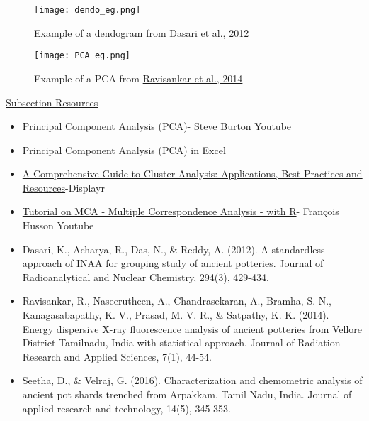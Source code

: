 \documentclass{article}
\begin{document}
\begin{figure}[hbt!]
    \centering
    \texttt{[image: dendo\_eg.png]}
    \caption{Example of a dendogram from \protect\hyperlink{dasari}{Dasari et al., 2012}}
    \label{fig:dendogram_eg}
\end{figure}

\begin{figure}[hbt!]
    \centering
    \texttt{[image: PCA\_eg.png]}
    \caption{Example of a PCA from \protect\hyperlink{ravisankar}{Ravisankar et al., 2014}}
    \label{fig:pca_eg}
\end{figure}

\newpage
\underline{Subsection Resources}

\begin{itemize}
    \item \href{https://www.youtube.com/watch?v=fkf4IBRSeEc}{Principal Component Analysis (PCA)}- Steve Burton Youtube
    \item \href{https://help.xlstat.com/6776-principal-component-analysis-pca-excel}{Principal Component Analysis (PCA) in Excel}
    \item \href{https://www.displayr.com/understanding-cluster-analysis-a-comprehensive-guide/}{A Comprehensive Guide to Cluster Analysis: Applications, Best Practices and Resources}-Displayr
    \item \href{https://www.youtube.com/watch?v=0z30RDikYaw}{Tutorial on MCA - Multiple Correspondence Analysis - with R}- François Husson Youtube
    \item \hypertarget{dasari}{Dasari, K., Acharya, R., Das, N., \& Reddy, A. (2012). A standardless approach of INAA for grouping study of ancient potteries. Journal of Radioanalytical and Nuclear Chemistry, 294(3), 429-434.}
    \item \hypertarget{ravisankar}{Ravisankar, R., Naseerutheen, A., Chandrasekaran, A., Bramha, S. N., Kanagasabapathy, K. V., Prasad, M. V. R., \& Satpathy, K. K. (2014). Energy dispersive X-ray fluorescence analysis of ancient potteries from Vellore District Tamilnadu, India with statistical approach. Journal of Radiation Research and Applied Sciences, 7(1), 44-54.}
    \item \hypertarget{seetha}{Seetha, D., \& Velraj, G. (2016). Characterization and chemometric analysis of ancient pot shards trenched from Arpakkam, Tamil Nadu, India. Journal of applied research and technology, 14(5), 345-353.}
\end{itemize}
\end{document}
